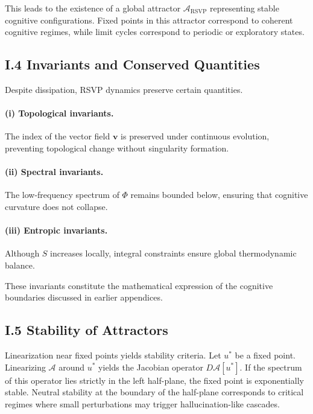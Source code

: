\documentclass[12pt]{article}
\begin{document}
This leads to the existence of a global attractor $\mathcal{A}_{\mathrm{RSVP}}$ 
representing stable cognitive configurations.  
Fixed points in this attractor correspond to coherent cognitive regimes, while 
limit cycles correspond to periodic or exploratory states.

\subsection*{I.4 Invariants and Conserved Quantities}

Despite dissipation, RSVP dynamics preserve certain quantities.

\paragraph{(i) Topological invariants.}  
The index of the vector field $\mathbf{v}$ is preserved under continuous 
evolution, preventing topological change without singularity formation.

\paragraph{(ii) Spectral invariants.}  
The low-frequency spectrum of $\Phi$ remains bounded below, ensuring that 
cognitive curvature does not collapse.

\paragraph{(iii) Entropic invariants.}  
Although $S$ increases locally, integral constraints ensure global 
thermodynamic balance.

These invariants constitute the mathematical expression of the cognitive 
boundaries discussed in earlier appendices.

\subsection*{I.5 Stability of Attractors}

Linearization near fixed points yields stability criteria.  
Let $u^\ast$ be a fixed point.  
Linearizing $\mathcal{A}$ around $u^\ast$ yields the Jacobian operator 
$D\mathcal{A}[u^\ast]$.  
If the spectrum of this operator lies strictly in the left half-plane, the 
fixed point is exponentially stable.  
Neutral stability at the boundary of the half-plane corresponds to critical 
regimes where small perturbations may trigger hallucination-like cascades.
\end{document}
